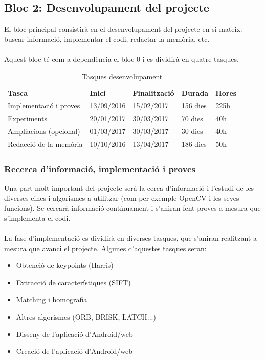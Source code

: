 	\subsection{Bloc 2: Desenvolupament del projecte}
			El bloc principal consistirà en el desenvolupament del projecte en si mateix: buscar informació, implementar el codi, redactar la memòria, etc.\\\\
			Aquest bloc té com a dependència el bloc 0 i es dividirà en quatre tasques.\\
			\begin{table}[H]
				\begin{center}
					\begin{tabular}{p{5cm} !{\vrule width -1pt}x{2.1cm} !{\vrule width -1pt}x{2.4cm} !{\vrule width -1pt}x{1.6cm} !{\vrule width -1pt}x{1.6cm}}
						\textbf{Tasca} & \textbf{Inici} & \textbf{Finalització} & \textbf{Durada} & \textbf{Hores} \\ %
						Implementació i proves & 13/09/2016 & 15/02/2017 & 156 dies & 225h \\
						Experiments & 20/01/2017 & 30/03/2017 & 70 dies & 40h \\
						Ampliacions (opcional) & 01/03/2017 & 30/03/2017 & 30 dies & 40h \\
						Redacció de la memòria & 10/10/2016 & 13/04/2017 & 186 dies & 50h \\
					\end{tabular}
				\end{center}
				\caption{Tasques desenvolupament}
			\end{table}

		\subsubsection{Recerca d'informació, implementació i proves}
			Una part molt important del projecte serà la cerca d'informació i l'estudi de les diverses eines i algorismes a utilitzar (com per exemple OpenCV i les seves funcions).
			Se cercarà informació contínuament i s'aniran fent proves a mesura que s'implementa el codi.\\\\
			La fase d'implementació es dividirà en diverses tasques, que s'aniran realitzant a mesura que avanci el projecte. Algunes d'aquestes tasques seran:
			\begin{itemize}
				\item{Obtenció de keypoints (Harris)}
				\item{Extracció de característiques (SIFT)}
				\item{Matching i homografia}
				\item{Altres algorismes (ORB, BRISK, LATCH...)}
				\item{Disseny de l'aplicació d'Android/web}
				\item{Creació de l'aplicació d'Android/web}
			\end{itemize}
